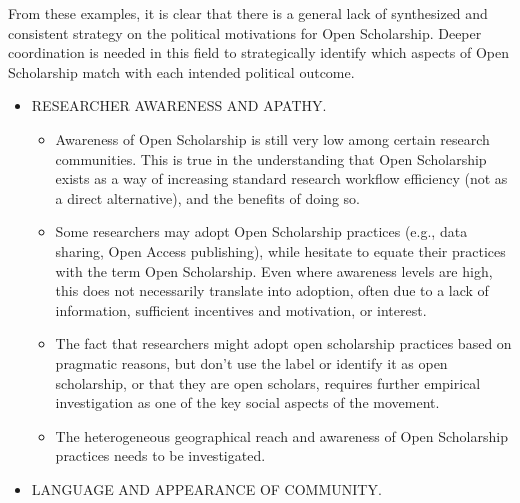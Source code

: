 \documentclass[]{article}
\begin{document}
From these examples, it is clear that there is a general lack of
synthesized and consistent strategy on the political motivations for
Open Scholarship. Deeper coordination is needed in this field to
strategically identify which aspects of Open Scholarship match with each
intended political outcome.

\begin{itemize}
\item
  RESEARCHER AWARENESS AND APATHY.

  \begin{itemize}
  \item
    Awareness of Open Scholarship is still very low among certain
    research communities. This is true in the understanding that Open
    Scholarship exists as a way of increasing standard research workflow
    efficiency (not as a direct alternative), and the benefits of doing
    so.
  \item
    Some researchers may adopt Open Scholarship practices (e.g., data
    sharing, Open Access publishing), while hesitate to equate their
    practices with the term Open Scholarship. Even where awareness
    levels are high, this does not necessarily translate into adoption,
    often due to a lack of information, sufficient incentives and
    motivation, or interest.
  \item
    The fact that researchers might adopt open scholarship practices
    based on pragmatic reasons, but don't use the label or identify it
    as open scholarship, or that they are open scholars, requires
    further empirical investigation as one of the key social aspects of
    the movement.
  \item
    The heterogeneous geographical reach and awareness of Open
    Scholarship practices needs to be investigated.
  \end{itemize}
\item
  LANGUAGE AND APPEARANCE OF COMMUNITY.


\end{itemize}
\end{document}
